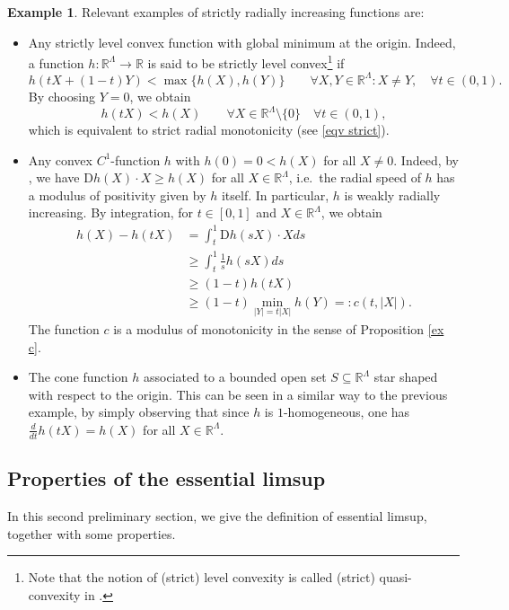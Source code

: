 \documentclass[a4paper,11pt]{article}
\numberwithin{equation}{section}
\newcommand{\numberset}{\mathbb}
\newcommand{\R}{\numberset{R}}
\newcommand{\rom}{\mathrm}
\theoremstyle{definition}
\newtheorem{Example}[Theorem]{Example}
\begin{document}
\begin{Example}\label{Ex}
Relevant examples of strictly radially increasing functions are:
\begin{itemize}
\item Any strictly level convex function with global minimum at the origin. Indeed, a function $h:\R^\Lambda\longrightarrow \R$ is said to be strictly level convex\footnote{Note that the notion of (strict) level convexity is called (strict) quasi-convexity in \cite{BJW}. } if
$$
h(tX+(1-t)Y)<\max\{h(X),h(Y)\}\qquad\forall X,Y\in\R^\Lambda: X\neq Y,\quad\forall t\in (0,1).
$$
By choosing $Y=0$, we obtain
$$
h(tX)<h(X)\qquad\forall X\in\R^\Lambda\setminus\{0\}\quad\forall t\in (0,1),
$$
which is equivalent to strict radial monotonicity (see \eqref{eqv strict}).
\item Any convex $C^1$-function $h$ with $h(0)=0<h(X)$ for all $X\neq0$. Indeed, by \cite[Thm 2.52]{Dac}, we have $\rom Dh(X)\cdot X\geq h(X)$ for all $X\in \R^\Lambda$, i.e.\ the radial speed of $h$ has a modulus of positivity given by $h$ itself. In particular, $h$ is weakly radially increasing. By integration, for $t\in[0,1]$ and $X\in \R^\Lambda$, we obtain
\begin{align*}
h(X)-h(tX)&=\int_t^{1}\rom Dh(sX)\cdot Xds\\
&\geq\int_t^1\frac1sh(sX)ds\\
&\geq({1-t})h(tX)\\
&\geq({1-t})\min_{|Y|=t|X|}h(Y)=:c(t,|X|).
\end{align*}
The function $c$ is a modulus of monotonicity in the sense of Proposition \ref{ex c}.
\item The cone function $h$ associated to a bounded open set $S\subseteq\R^\Lambda$ star shaped with respect to  the origin. This can be seen in a similar way to the previous example, by simply observing that since $h$ is $1$-homogeneous, one has $\frac{d}{dt}h(tX)=h(X)$ for all $X\in \R^\Lambda$.

\end{itemize}
\end{Example}






\subsection{Properties of the essential limsup}
In this second preliminary section, we give the definition of essential limsup, together with some properties.
\end{document}
